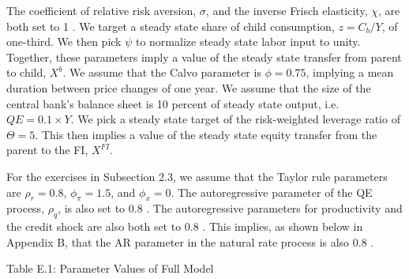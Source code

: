 \documentclass[10pt]{article}
\begin{document}
The coefficient of relative risk aversion, $\sigma$, and the inverse Frisch elasticity, $\chi$, are both set to 1 . We target a steady state share of child consumption, $z=C_{b} / Y$, of one-third. We then pick $\psi$ to normalize steady state labor input to unity. Together, these parameters imply a value of the steady state transfer from parent to child, $X^{b}$. We assume that the Calvo parameter is $\phi=0.75$, implying a mean duration between price changes of one year. We assume that the size of the central bank's balance sheet is 10 percent of steady state output, i.e. $Q E=0.1 \times Y$. We pick a steady state target of the risk-weighted leverage ratio of $\Theta=5$. This then implies a value of the steady state equity transfer from the parent to the FI, $X^{F I}$.

For the exercises in Subsection 2.3, we assume that the Taylor rule parameters are $\rho_{r}=0.8$, $\phi_{\pi}=1.5$, and $\phi_{x}=0$. The autoregressive parameter of the QE process, $\rho_{q}$, is also set to 0.8 . The autoregressive parameters for productivity and the credit shock are also both set to 0.8 . This implies, as shown below in Appendix B, that the AR parameter in the natural rate process is also 0.8 .

Table E.1: Parameter Values of Full Model
\end{document}
